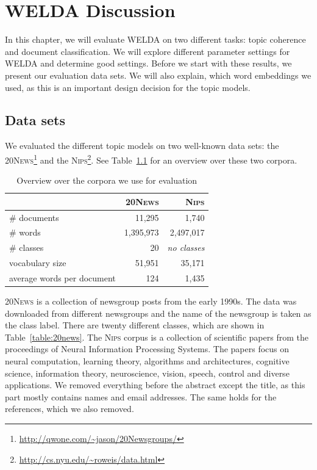 \documentclass[
        a4paper,
        titlepage,
        twoside,
        parskip
        ]{scrbook}
\newcommand{\ra}[1]{\renewcommand{\arraystretch}{#1}}
\theoremstyle{break}
\begin{document}
\chapter{WELDA Discussion}

In this chapter, we will evaluate WELDA on two different tasks: topic coherence and document classification.
We will explore different parameter settings for WELDA and determine good settings.
Before we start with these results, we present our evaluation data sets.
We will also explain, which word embeddings we used, as this is an important design decision for the topic models.

\section{Data sets}

We evaluated the different topic models on two well-known data sets: the \textsc{20News}\footnote{\url{http://qwone.com/~jason/20Newsgroups/}} and the \textsc{Nips}\footnote{\url{http://cs.nyu.edu/~roweis/data.html}}.
See Table~\ref{table:data_sets} for an overview over these two corpora.
\begin{table}[]
  \ra{1.3}
  \centering
  \caption{Overview over the corpora we use for evaluation}
  \label{table:data_sets}
  \begin{tabular}{@{}lrr@{}}
    \toprule
                               & \textsc{20News} & \textsc{Nips}                \\ \midrule
                               \# documents               & 11,295            & 1,740               \\
                               \# words                   & 1,395,973         & 2,497,017           \\
                               \# classes                 & 20                & \textit{no classes} \\
                               vocabulary size            & 51,951            & 35,171              \\
                               average words per document & 124               & 1,435               \\
                               \bottomrule
  \end{tabular}
\end{table}
\textsc{20News} is a collection of newsgroup posts from the early 1990s.
The data was downloaded from different newsgroups and the name of the newsgroup is taken as the class label.
There are twenty different classes, which are shown in Table~\ref{table:20news}.
The \textsc{Nips} corpus is a collection of scientific papers from the proceedings of Neural Information Processing Systems.
The papers focus on neural computation, learning theory, algorithms and architectures, cognitive science, information theory, neuroscience, vision, speech, control and diverse applications.
We removed everything before the abstract except the title, as this part mostly contains names and email addresses.
The same holds for the references, which we also removed.
\end{document}
